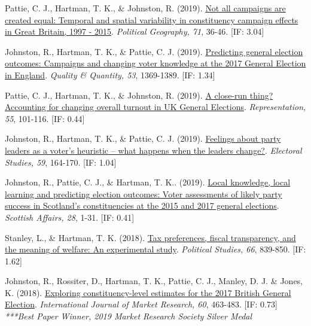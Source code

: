 \documentclass[12pt]{article}
\begin{document}
\begin{bibenum}
	\item Pattie, C. J., {Hartman, T. K.}, \& Johnston, R. (2019). 
	    \href{https://10.1016/j.polgeo.2019.02.010}
		{Not all campaigns are created equal: Temporal and spatial variability 
		in constituency campaign effects in Great Britain, 1997 - 2015}. 
	 	\emph{Political Geography, 71}, 36-46. [IF: 3.04]
	 	    
	\item Johnston, R., {Hartman, T. K.}, \& Pattie, C. J. (2019). 
		\href{https://10.1007/s11135-018-0819-1}
		{Predicting general election outcomes: Campaigns and changing voter 
		knowledge at the 2017 General Election in England}.
		\emph{Quality \& Quantity, 53}, 1369-1389. [IF: 1.34]
	 	    
    \item Pattie, C. J., {Hartman, T. K.}, \& Johnston, R. (2019).
    	\href{https://10.1080/00344893.2018.1555676}
    	{A close-run thing? Accounting for changing overall turnout in UK General Elections}.
    	\emph{Representation, 55}, 101-116. [IF: 0.44]

    \item Johnston, R., {Hartman, T. K.}, \& Pattie, C. J. (2019). 
    		\href{https://10.1016/j.electstud.2018.12.005}
    		{Feelings about party leaders as a voter's heuristic -- 
    		what happens when the leaders change?}.
        \emph{Electoral Studies, 59}, 164-170. [IF: 1.04]
          
	\item Johnston, R., Pattie, C. J., \& {Hartman, T. K.}. (2019). 
		\href{https://10.3366/scot.2019.0263}
		{Local knowledge, local learning and predicting election outcomes: 
		Voter assessments of likely party success in Scotland's constituencies 
		at the 2015 and 2017 general elections}.
		\emph{Scottish Affairs, 28}, 1-31. [IF: 0.41]
		
	\item *Stanley, L., \& {Hartman, T. K.} (2018).
          \href{https://10.1177/0032321717731661}
          {Tax preferences, fiscal transparency, and the meaning of welfare: 
          An experimental study}. 
          \emph{Political Studies, 66}, 839-850. [IF: 1.62]
          
	\item Johnston, R., Rossiter, D., {Hartman, T. K.}, Pattie, C. J., 
		   Manley, D. J. \&  Jones, K. (2018). 
		  \href{https://10.1177/1470785318778247}
		  {Exploring constituency-level estimates for the 2017 British General Election}.
		  \emph{International Journal of Market Research, 60}, 463-483. [IF: 0.73]\\
		  \textit{***Best Paper Winner, 2019 Market Research Society Silver Medal}


\end{bibenum}
\end{document}
